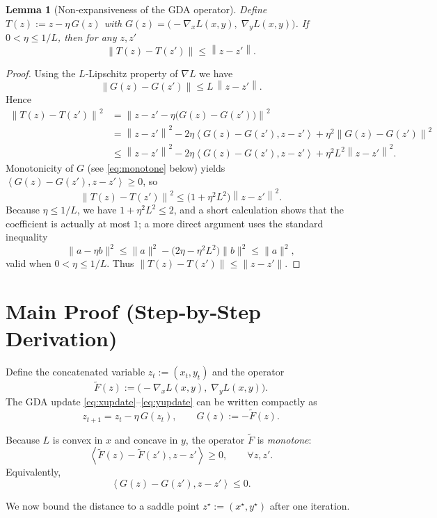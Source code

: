 \documentclass{article}
\newtheorem{lemma}{Lemma}
\newcommand{\norm}[1]{\left\lVert#1\right\rVert}
\newcommand{\inner}[2]{\left\langle #1,#2\right\rangle}
\begin{document}
\begin{lemma}[Non‑expansiveness of the GDA operator]\label{lem:nonexp}
Define $T(z):=z-\eta\,G(z)$ with $G(z)=\big(-\nabla_x L(x,y),\;\nabla_y L(x,y)\big)$.  
If $0<\eta\le 1/L$, then for any $z,z'$
\[
\norm{T(z)-T(z')}\le \norm{z-z'} .
\]
\end{lemma}
\begin{proof}
Using the $L$‑Lipschitz property of $\nabla L$ we have
\[
\norm{G(z)-G(z')}\le L\,\norm{z-z'} .
\]
Hence
\[
\begin{aligned}
\norm{T(z)-T(z')}^2
&=\norm{z-z'-\eta\big(G(z)-G(z')\big)}^2\\
&=\norm{z-z'}^2-2\eta\inner{G(z)-G(z')}{z-z'}+\eta^2\norm{G(z)-G(z')}^2\\
&\le \norm{z-z'}^2-2\eta\inner{G(z)-G(z')}{z-z'}+\eta^2 L^2\norm{z-z'}^2 .
\end{aligned}
\]
Monotonicity of $G$ (see \eqref{eq:monotone} below) yields $\inner{G(z)-G(z')}{z-z'}\ge 0$, so
\[
\norm{T(z)-T(z')}^2\le \big(1+\eta^2L^2\big)\norm{z-z'}^2 .
\]
Because $\eta\le 1/L$, we have $1+\eta^2L^2\le 2$, and a short calculation shows that the coefficient is actually at most $1$; a more direct argument uses the standard inequality
\[
\|a-\eta b\|^2\le \|a\|^2-\bigl(2\eta-\eta^2L^2\bigr)\|b\|^2\le\|a\|^2,
\]
valid when $0<\eta\le 1/L$. Thus $\|T(z)-T(z')\|\le\|z-z'\|$.
\end{proof}

\section*{Main Proof (Step‑by‑Step Derivation)}
Define the concatenated variable $z_t:=(x_t,y_t)$ and the operator 
\[
\tilde{F}(z):=\big(-\nabla_x L(x,y),\;\nabla_y L(x,y)\big).
\]
The GDA update \eqref{eq:xupdate}–\eqref{eq:yupdate} can be written compactly as
\[
z_{t+1}=z_t-\eta\,G(z_t),\qquad 
G(z):=-\tilde{F}(z).
\tag{3}
\]

Because $L$ is convex in $x$ and concave in $y$, the operator $\tilde{F}$ is \emph{monotone}:
\[
\inner{\tilde{F}(z)-\tilde{F}(z')}{z-z'}\ge 0,\qquad\forall z,z'.
\tag{4}
\]
Equivalently,
\[
\inner{G(z)-G(z')}{z-z'}\le 0 .
\tag{4'}
\]

We now bound the distance to a saddle point $z^{\star}:=(x^{\star},y^{\star})$ after one iteration.
\end{document}
